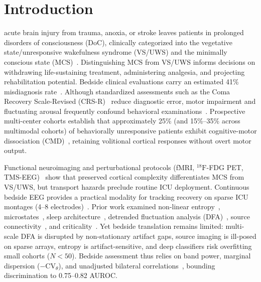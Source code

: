 \documentclass[journal,twoside,web]{ieeecolor}
\begin{document}
\section{Introduction}
 acute brain injury from trauma, anoxia, or stroke leaves patients in prolonged disorders of consciousness (DoC), clinically categorized into the vegetative state/unresponsive wakefulness syndrome (VS/UWS) and the minimally conscious state (MCS)~\cite{giacino2002minimally,giacino2018practice}. Distinguishing MCS from VS/UWS informs decisions on withdrawing life-sustaining treatment, administering analgesia, and projecting rehabilitation potential. Bedside clinical evaluations carry an estimated 41\% misdiagnosis rate~\cite{schnakers2009diagnostic}. Although standardized assessments such as the Coma Recovery Scale-Revised (CRS-R)~\cite{schnakers2009diagnostic} reduce diagnostic error, motor impairment and fluctuating arousal frequently confound behavioral examinations~\cite{cruse2011bedside}. Prospective multi-center cohorts establish that approximately 25\% (and 15\%--35\% across multimodal cohorts) of behaviorally unresponsive patients exhibit cognitive-motor dissociation (CMD)~\cite{bodien2024cognitive}, retaining volitional cortical responses without overt motor output.

Functional neuroimaging and perturbational protocols (fMRI, $^{18}\text{F}$-FDG PET, TMS-EEG)~\cite{casali2013theoretically,chennu2017brain} show that preserved cortical complexity differentiates MCS from VS/UWS, but transport hazards preclude routine ICU deployment. Continuous bedside EEG provides a practical modality for tracking recovery on sparse ICU montages (4--8 electrodes)~\cite{sitt2014large,engemann2018robust,bareham2020spectral}. Prior work examined non-linear entropy~\cite{bandt2002permutation,sitt2014large}, microstates~\cite{ling2024microstates}, sleep architecture~\cite{wielek2018sleep,xiao2026sleep}, detrended fluctuation analysis (DFA)~\cite{thiery2018long,wei2023aberrant}, source connectivity~\cite{bai2021spontaneous}, and criticality~\cite{toker2022consciousness}. Yet bedside translation remains limited: multi-scale DFA is disrupted by non-stationary artifact gaps, source imaging is ill-posed on sparse arrays, entropy is artifact-sensitive, and deep classifiers risk overfitting small cohorts ($N < 50$). Bedside assessment thus relies on band power, marginal dispersion ($-\mathrm{CV}_\theta$), and unadjusted bilateral correlations~\cite{bareham2020spectral,wielek2018sleep}, bounding discrimination to 0.75--0.82 AUROC.
\end{document}
